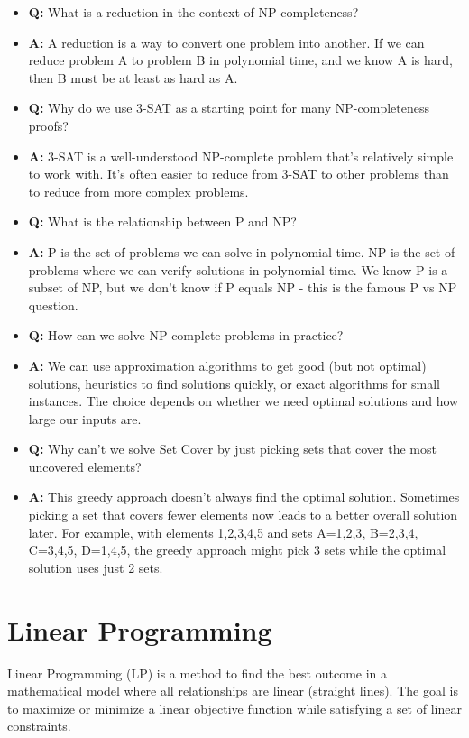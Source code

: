 \documentclass[11pt,a4paper]{article}
\begin{document}
\begin{multicols}{2}
\begin{itemize}
    \item \textbf{Q:} What is a reduction in the context of NP-completeness?
    \item \textbf{A:} A reduction is a way to convert one problem into another. If we can reduce problem A to problem B in polynomial time, and we know A is hard, then B must be at least as hard as A.

    \item \textbf{Q:} Why do we use 3-SAT as a starting point for many NP-completeness proofs?
    \item \textbf{A:} 3-SAT is a well-understood NP-complete problem that's relatively simple to work with. It's often easier to reduce from 3-SAT to other problems than to reduce from more complex problems.

    \item \textbf{Q:} What is the relationship between P and NP?
    \item \textbf{A:} P is the set of problems we can solve in polynomial time. NP is the set of problems where we can verify solutions in polynomial time. We know P is a subset of NP, but we don't know if P equals NP - this is the famous P vs NP question.

    \item \textbf{Q:} How can we solve NP-complete problems in practice?
    \item \textbf{A:} We can use approximation algorithms to get good (but not optimal) solutions, heuristics to find solutions quickly, or exact algorithms for small instances. The choice depends on whether we need optimal solutions and how large our inputs are.

    \item \textbf{Q:} Why can't we solve Set Cover by just picking sets that cover the most uncovered elements?
    \item \textbf{A:} This greedy approach doesn't always find the optimal solution. Sometimes picking a set that covers fewer elements now leads to a better overall solution later. For example, with elements {1,2,3,4,5} and sets A={1,2,3}, B={2,3,4}, C={3,4,5}, D={1,4,5}, the greedy approach might pick 3 sets while the optimal solution uses just 2 sets.
\end{itemize}

\section{Linear Programming}
Linear Programming (LP) is a method to find the best outcome in a mathematical model where all relationships are linear (straight lines). The goal is to maximize or minimize a linear objective function while satisfying a set of linear constraints.


\end{multicols}
\end{document}

